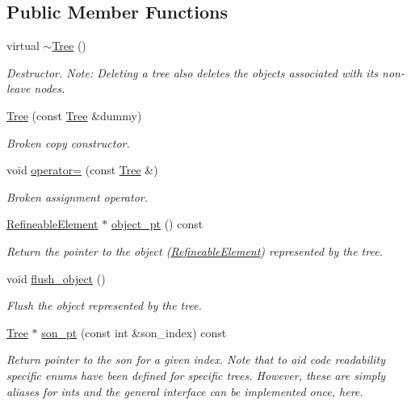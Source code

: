 \subsection*{Public Member Functions}
\begin{DoxyCompactItemize}
\item 
virtual \hyperlink{classoomph_1_1Tree_ace0b4169cf94a040c280af8e14f6a283}{$\sim$\+Tree} ()
\begin{DoxyCompactList}\small\item\em Destructor. Note\+: Deleting a tree also deletes the objects associated with its non-\/leave nodes. \end{DoxyCompactList}\item 
\hyperlink{classoomph_1_1Tree_af14116bedf82f96556877c475c73c6e3}{Tree} (const \hyperlink{classoomph_1_1Tree}{Tree} \&dummy)
\begin{DoxyCompactList}\small\item\em Broken copy constructor. \end{DoxyCompactList}\item 
void \hyperlink{classoomph_1_1Tree_a931f95671b788bbba03a7908bb205e5e}{operator=} (const \hyperlink{classoomph_1_1Tree}{Tree} \&)
\begin{DoxyCompactList}\small\item\em Broken assignment operator. \end{DoxyCompactList}\item 
\hyperlink{classoomph_1_1RefineableElement}{Refineable\+Element} $\ast$ \hyperlink{classoomph_1_1Tree_a2f2eeb0f1dd161f696cccc652974ff4c}{object\+\_\+pt} () const
\begin{DoxyCompactList}\small\item\em Return the pointer to the object (\hyperlink{classoomph_1_1RefineableElement}{Refineable\+Element}) represented by the tree. \end{DoxyCompactList}\item 
void \hyperlink{classoomph_1_1Tree_a96a95bd9942e906fde87194845a1868c}{flush\+\_\+object} ()
\begin{DoxyCompactList}\small\item\em Flush the object represented by the tree. \end{DoxyCompactList}\item 
\hyperlink{classoomph_1_1Tree}{Tree} $\ast$ \hyperlink{classoomph_1_1Tree_ab2ca6416d7a368e29da6a6a998f460c7}{son\+\_\+pt} (const int \&son\+\_\+index) const
\begin{DoxyCompactList}\small\item\em Return pointer to the son for a given index. Note that to aid code readability specific enums have been defined for specific trees. However, these are simply aliases for ints and the general interface can be implemented once, here. \end{DoxyCompactList}\item 

\end{DoxyCompactItemize}
